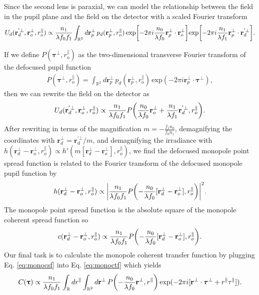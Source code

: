 \documentclass[]{osa-article}
\let\originalleft\left
\let\originalright\right
\renewcommand{\left}{\mathopen{}\mathclose\bgroup\originalleft}
\renewcommand{\right}{\aftergroup\egroup\originalright}
\providecommand{\mb}[1]{\mathbf{#1}}
\newcommand{\mypar}{\parallel}
\providecommand{\ropar}{r_o^{\mypar}}
\providecommand{\roperp}{\mathbf{r}_o^{\bot}}
\providecommand{\rpperp}{\mathbf{r}_p^{\bot}}
\providecommand{\rd}{\mathbf{r}^{\bot}_d}
\providecommand{\rdp}{\mathbf{r}^{'\bot}_d}
\providecommand{\mbb}[1]{\mathbb{#1}}
\providecommand{\bs}[1]{\boldsymbol{#1}}
\providecommand{\bt}{\bs{\uptau}}
\providecommand{\btperp}{\bs{\tau}^{\bot}}
\providecommand{\btpar}{\tau^{\mypar}}
\begin{document}
Since the second lens is paraxial, we can model the relationship between the field in the pupil plane and the field on the detector with a scaled Fourier transform
\begin{align}
  U_d(\rdp, \roperp, \ropar) \propto \frac{n_1}{\lambda f_0f_1}\int_{\mbb{R}^2}d\rpperp\,p_d(\rpperp, \ropar)\,\text{exp}\left[-2\pi i \frac{n_0}{\lambda f_0}\rpperp\cdot\roperp\right]\text{exp}\left[-2\pi i \frac{n_1}{\lambda f_1}\rpperp\cdot\rdp\right].
\end{align}

If we define $P(\btperp, \ropar)$ as the two-dimensional transverse Fourier transform of the defocused pupil function
\begin{align}
  P(\btperp, \ropar) = \int_{\mbb{R}^2}d\rpperp\, p_d(\rpperp, \ropar)\,\text{exp}(-2\pi i \rpperp\cdot\btperp),\label{eq:pupilF}
\end{align}
then we can rewrite the field on the detector as
\begin{align}
  U_d(\rdp, \roperp, \ropar) \propto \frac{n_1}{\lambda f_0f_1}P\left(\frac{n_0}{\lambda f_0}\roperp + \frac{n_1}{\lambda f_1}\rdp, \ropar\right).
\end{align}
After rewriting in terms of the magnification $m = -\frac{f_1 n_0}{f_0 n_1}$, demagnifying the coordinates with $\rd = \rdp/m$, and demagnifying the irradiance with $h(\rd - \roperp, \ropar) \propto h'(m[\rd - \roperp], \ropar) $, we find the defocused monopole point spread function is related to the Fourier transform of the defocused monopole pupil function by 
\begin{align}
  h(\rd-\roperp, \ropar) \propto \left|\frac{n_1}{\lambda f_0f_1}P\left(-\frac{n_0}{\lambda f_0}[\rd - \roperp], \ropar\right)\right|^2.
\end{align}
The monopole point spread function is the absolute square of the monopole coherent spread function so
\begin{align}
  c(\rd - \roperp, \ropar) \propto \frac{n_1}{\lambda f_0f_1}P\left(-\frac{n_0}{\lambda f_0}[\rd - \roperp], \ropar\right). \label{eq:monocsf}
\end{align}
Our final task is to calculate the monopole coherent transfer function by plugging Eq. \eqref{eq:monocsf} into Eq. \eqref{eq:monoctf} which yields
\begin{align}
  C(\bt) \propto \frac{n_1}{\lambda f_0f_1}\int_{\mbb{R}}dr^{\mypar}\int_{\mbb{R}^2}d\mb{r}^{\bot}\, P\left(-\frac{n_0}{\lambda f_0}\mb{r}^{\bot}, r^{\mypar}\right)\,\text{exp}(-2\pi i[\mb{r}^{\bot}\cdot\btperp + r^{\mypar}\btpar]).
\end{align}
\end{document}
